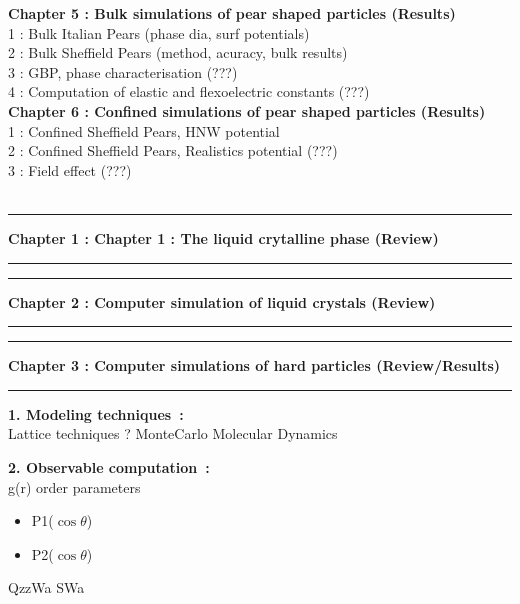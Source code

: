 \documentclass[a4paper]{article}
\newcommand{\mkChap}[1]
	{
	\large\textbf{#1}
	\vspace{2mm}\\
	}
\newcommand{\mkChapBig}[1]
	{
	\newpage
	\hrule
	\begin{center}
	\LARGE\textbf{#1}
	\end{center}
	\hrule
	\vspace{5mm}
	}
\newcommand{\mkSectionBig}[1]
	{
	\Large\textbf{#1}\\
	}
\newcommand{\mkSection}[1]
	{
	\hspace*{25mm}#1\\
	}
\begin{document}
\mkChap{Chapter 5 : Bulk simulations of pear shaped particles (Results)} 
	\mkSection{ 1 :  Bulk Italian Pears (phase dia, surf potentials)}
	\mkSection{ 2 :  Bulk Sheffield Pears (method, acuracy, bulk results)}
	\mkSection{ 3 :  GBP, phase characterisation (???)}
	\mkSection{ 4 :  Computation of elastic and flexoelectric constants (???)}


\mkChap{Chapter 6 : Confined simulations of pear shaped particles (Results)} 
	\mkSection{ 1 :  Confined Sheffield Pears, HNW potential }
	\mkSection{ 2 :  Confined Sheffield Pears, Realistics potential (???)}
	\mkSection{ 3 :  Field effect (???)}\\

\mkChapBig{Chapter 1 : Chapter 1 : The liquid crytalline phase (Review)}


\mkChapBig{Chapter 2 : Computer simulation of liquid crystals (Review)}


\mkChapBig{Chapter 3 : Computer simulations of hard particles (Review/Results)}

\mkSectionBig{1. Modeling techniques~:}
Lattice techniques ?
MonteCarlo
Molecular Dynamics

\mkSectionBig{2. Observable computation~:}
g(r)
order parameters
\begin{itemize}
       \item P1($\cos\theta$)
       \item P2($\cos\theta$)
\end{itemize}
QzzWa
SWa
\end{document}
